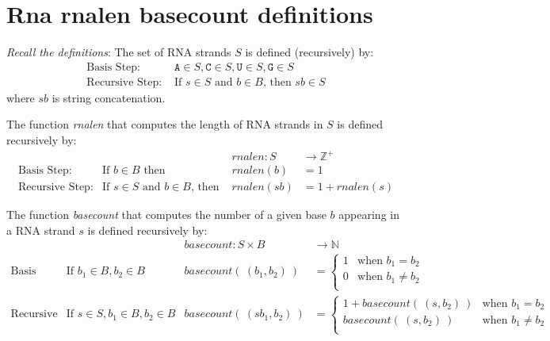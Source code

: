 \documentclass[12pt, oneside]{article}
\newcommand{\A}[0]{\texttt{A}}
\newcommand{\C}[0]{\texttt{C}}
\newcommand{\G}[0]{\texttt{G}}
\newcommand{\U}[0]{\texttt{U}}
\begin{document}
\vfill
 \vfill
\section*{Rna rnalen basecount definitions}


{\it Recall the definitions}: The set of RNA strands $S$ is defined (recursively) by:
\[
\begin{array}{ll}
\textrm{Basis Step: } & \A \in S, \C \in S, \U \in S, \G \in S \\
\textrm{Recursive Step: } & \textrm{If } s \in S\textrm{ and }b \in B \textrm{, then }sb \in S
\end{array}
\]
where $sb$ is string concatenation.

The function \textit{rnalen} that computes the length of RNA strands in $S$ is defined recursively by:
\[
\begin{array}{llll}
& & \textit{rnalen} : S & \to \mathbb{Z}^+ \\
\textrm{Basis Step:} & \textrm{If } b \in B\textrm{ then } & \textit{rnalen}(b) & = 1 \\
\textrm{Recursive Step:} & \textrm{If } s \in S\textrm{ and }b \in B\textrm{, then  } & \textit{rnalen}(sb) & = 1 + \textit{rnalen}(s)
\end{array}
\]

The function \textit{basecount} that computes the number of a given base 
$b$ appearing in a RNA strand $s$ is defined recursively by:
\[
\begin{array}{llll}
& & \textit{basecount} : S \times B & \to \mathbb{N} \\
\textrm{Basis Step:} &  \textrm{If } b_1 \in B, b_2 \in B & \textit{basecount}(~(b_1, b_2)~) & =
        \begin{cases}
            1 & \textrm{when } b_1 = b_2 \\
            0 & \textrm{when } b_1 \neq b_2 \\
        \end{cases} \\
\textrm{Recursive Step:} & \textrm{If } s \in S, b_1 \in B, b_2 \in B &\textit{basecount}(~(s b_1, b_2)~) & =
        \begin{cases}
            1 + \textit{basecount}(~(s, b_2)~) & \textrm{when } b_1 = b_2 \\
            \textit{basecount}(~(s, b_2)~) & \textrm{when } b_1 \neq b_2 \\
        \end{cases}
\end{array}
\] \vfill
\end{document}
